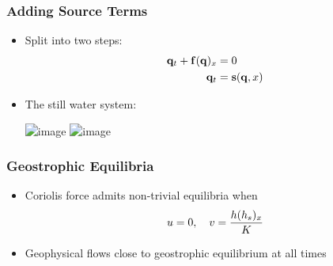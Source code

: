 \documentclass{beamer}
\begin{document}
\begin{frame}[t]
  \frametitle{Adding Source Terms}
  \begin{itemize}
    \item Split into two steps:
    \begin{align}
      \vb q_t + \vb f(\vb q)_x &= 0 \\
      \vb q_t &= \vb s(\vb q, x)
    \end{align}
    \item<2-> The still water system:\\
    \begin{center}
      \includegraphics<2>[width=0.65\textwidth]{img/bathymetry1}
      \includegraphics<3>[width=0.65\textwidth]{img/bathymetry2}
    \end{center}
  \end{itemize}
\end{frame}

\begin{frame}
  \frametitle{Geostrophic Equilibria}
  \begin{itemize}
    \item Coriolis force admits non-trivial equilibria when
    \begin{equation}
      u = 0\qc v = \frac{h (h_s)_x}{K}
    \end{equation}
    \begin{center}
    \end{center}
    \vspace{0.5cm}
    \item Geophysical flows close to geostrophic equilibrium at all times
  \end{itemize}
\end{frame}
\end{document}

